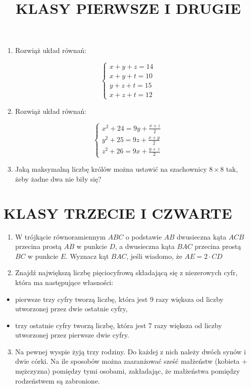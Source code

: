 \documentclass[10pt]{article}
\title{KLASY PIERWSZE I DRUGIE }
\author{}
\date{}
\begin{document}
\maketitle
\begin{enumerate}
  \item Rozwiąż układ równań:
\end{enumerate}

\[
\left\{\begin{array}{l}
x+y+z=14 \\
x+y+t=10 \\
y+z+t=15 \\
x+z+t=12
\end{array}\right.
\]

\begin{enumerate}
  \setcounter{enumi}{1}
  \item Rozwiąż układ równań:
\end{enumerate}

\[
\left\{\begin{array}{l}
x^{2}+24=9 y+\frac{x+z}{2} \\
y^{2}+25=9 z+\frac{x+y}{2} \\
z^{2}+26=9 x+\frac{y+z}{2}
\end{array}\right.
\]

\begin{enumerate}
  \setcounter{enumi}{2}
  \item Jaką maksymalną liczbę królów można ustawić na szachownicy \(8 \times 8\) tak, żeby żadne dwa nie biły się?
\end{enumerate}

\section*{KLASY TRZECIE I CZWARTE}
\begin{enumerate}
  \item W trójkącie równoramiennym \(A B C\) o podstawie \(A B\) dwusieczna kąta \(A C B\) przecina prostą \(A B\) w punkcie \(D\), a dwusieczna kąta \(B A C\) przecina prostą \(B C\) w punkcie \(E\). Wyznacz kąt \(B A C\), jeśli wiadomo, że \(A E=2 \cdot C D\)
  \item Znajdź największą liczbę pięciocyfrową składającą się z niezerowych cyfr, która ma następujące własności:
\end{enumerate}

\begin{itemize}
  \item pierwsze trzy cyfry tworzą liczbę, która jest 9 razy większa od liczby utworzonej przez dwie ostatnie cyfry,
  \item trzy ostatnie cyfry tworzą liczbę, która jest 7 razy większa od liczby utworzonej przez pierwsze dwie cyfry.
\end{itemize}

\begin{enumerate}
  \setcounter{enumi}{2}
  \item Na pewnej wyspie żyją trzy rodziny. Do każdej z nich należy dwóch synów i dwie córki. Na ile sposobów można zaaranżować sześć małżeństw (kobieta + mężczyzna) pomiędzy tymi osobami, zakładając, że małżeństwa pomiędzy rodzeństwem są zabronione.
\end{enumerate}
\end{document}
